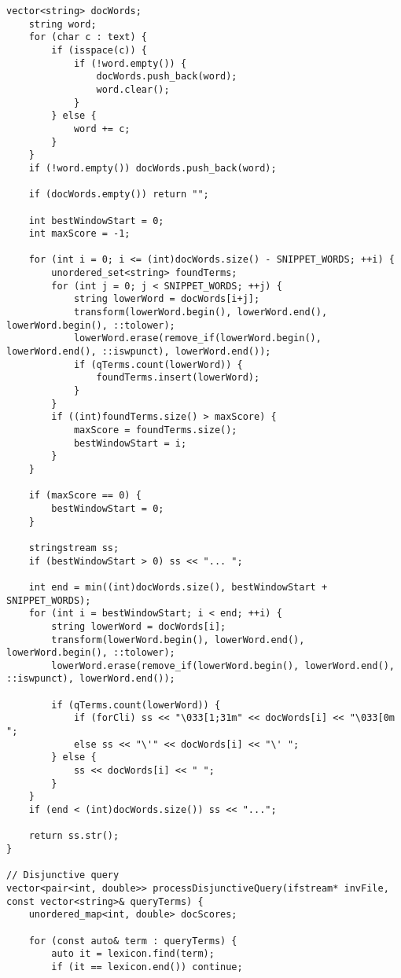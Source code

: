 \documentclass{article}
\begin{document}
\begin{lstlisting}[caption={The complete source code for the query processor component.}, label={lst:query}]
    vector<string> docWords;
    string word;
    for (char c : text) {
        if (isspace(c)) {
            if (!word.empty()) {
                docWords.push_back(word);
                word.clear();
            }
        } else {
            word += c;
        }
    }
    if (!word.empty()) docWords.push_back(word);
    
    if (docWords.empty()) return "";

    int bestWindowStart = 0;
    int maxScore = -1;

    for (int i = 0; i <= (int)docWords.size() - SNIPPET_WORDS; ++i) {
        unordered_set<string> foundTerms;
        for (int j = 0; j < SNIPPET_WORDS; ++j) {
            string lowerWord = docWords[i+j];
            transform(lowerWord.begin(), lowerWord.end(), lowerWord.begin(), ::tolower);
            lowerWord.erase(remove_if(lowerWord.begin(), lowerWord.end(), ::iswpunct), lowerWord.end());
            if (qTerms.count(lowerWord)) {
                foundTerms.insert(lowerWord);
            }
        }
        if ((int)foundTerms.size() > maxScore) {
            maxScore = foundTerms.size();
            bestWindowStart = i;
        }
    }
    
    if (maxScore == 0) {
        bestWindowStart = 0;
    }

    stringstream ss;
    if (bestWindowStart > 0) ss << "... ";

    int end = min((int)docWords.size(), bestWindowStart + SNIPPET_WORDS);
    for (int i = bestWindowStart; i < end; ++i) {
        string lowerWord = docWords[i];
        transform(lowerWord.begin(), lowerWord.end(), lowerWord.begin(), ::tolower);
        lowerWord.erase(remove_if(lowerWord.begin(), lowerWord.end(), ::iswpunct), lowerWord.end());

        if (qTerms.count(lowerWord)) {
            if (forCli) ss << "\033[1;31m" << docWords[i] << "\033[0m "; 
            else ss << "\'" << docWords[i] << "\' ";
        } else {
            ss << docWords[i] << " ";
        }
    }
    if (end < (int)docWords.size()) ss << "...";

    return ss.str();
}

// Disjunctive query
vector<pair<int, double>> processDisjunctiveQuery(ifstream* invFile, const vector<string>& queryTerms) {
    unordered_map<int, double> docScores;
    
    for (const auto& term : queryTerms) {
        auto it = lexicon.find(term);
        if (it == lexicon.end()) continue;
        

\end{lstlisting}
\end{document}
